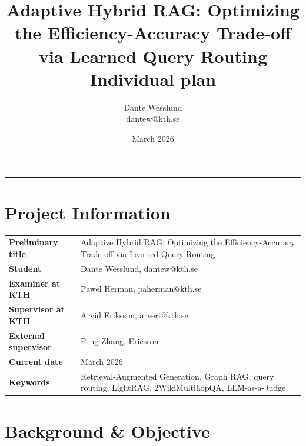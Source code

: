 \documentclass[11pt, a4paper]{article}
\begin{document}
\title{
    \textbf{Adaptive Hybrid RAG: Optimizing the Efficiency-Accuracy Trade-off via Learned Query Routing} \\
    \vspace{0.5em}
    \large Individual plan
}

\author{
    Dante Wesslund \\
    dantew@kth.se}


\date{March 2026}

\maketitle

\hrule
\vspace{1cm}


\section{Project Information}

\renewcommand{\arraystretch}{1.15}
\begin{tabular}{>{\raggedright\arraybackslash}p{4.4cm} >{\raggedright\arraybackslash}p{10cm}}
\textbf{Preliminary title} & Adaptive Hybrid RAG: Optimizing the Efficiency-Accuracy Trade-off via Learned Query Routing \\
\textbf{Student} & Dante Wesslund, dantew@kth.se \\
\textbf{Examiner at KTH} & Pawel Herman, paherman@kth.se  \\
\textbf{Supervisor at KTH} & Arvid Eriksson, arveri@kth.se \\
\textbf{External supervisor} & Peng Zhang, Ericsson \\
\textbf{Current date} & March 2026 \\
\textbf{Keywords} & Retrieval-Augmented Generation, Graph RAG, query routing, LightRAG, 2WikiMultihopQA, LLM-as-a-Judge \\
\end{tabular}

\section{Background \& Objective}
\end{document}
